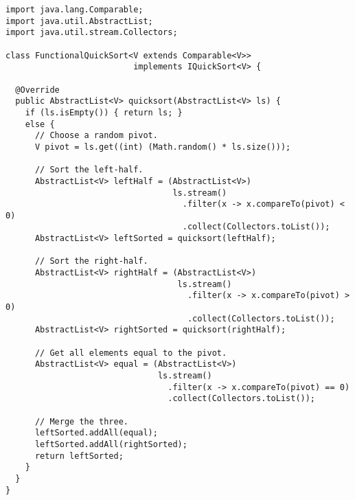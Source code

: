 \begin{lstlisting}[language=MyJava]
import java.lang.Comparable;
import java.util.AbstractList;
import java.util.stream.Collectors;

class FunctionalQuickSort<V extends Comparable<V>> 
                          implements IQuickSort<V> {

  @Override
  public AbstractList<V> quicksort(AbstractList<V> ls) {
    if (ls.isEmpty()) { return ls; }
    else {
      // Choose a random pivot.
      V pivot = ls.get((int) (Math.random() * ls.size()));

      // Sort the left-half.
      AbstractList<V> leftHalf = (AbstractList<V>) 
                                  ls.stream()
                                    .filter(x -> x.compareTo(pivot) < 0)
                                    .collect(Collectors.toList());
      AbstractList<V> leftSorted = quicksort(leftHalf);

      // Sort the right-half.
      AbstractList<V> rightHalf = (AbstractList<V>) 
                                   ls.stream()
                                     .filter(x -> x.compareTo(pivot) > 0)
                                     .collect(Collectors.toList());
      AbstractList<V> rightSorted = quicksort(rightHalf);

      // Get all elements equal to the pivot.
      AbstractList<V> equal = (AbstractList<V>) 
                               ls.stream()
                                 .filter(x -> x.compareTo(pivot) == 0)
                                 .collect(Collectors.toList());

      // Merge the three.
      leftSorted.addAll(equal);
      leftSorted.addAll(rightSorted);
      return leftSorted;
    }
  }
}
\end{lstlisting}

\newpage
